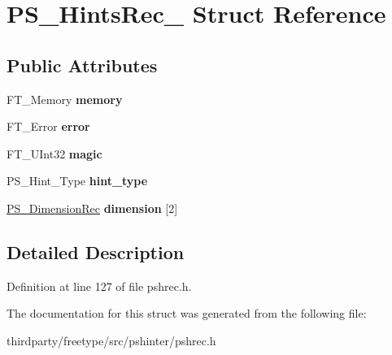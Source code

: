 \hypertarget{struct_p_s___hints_rec__}{}\section{P\+S\+\_\+\+Hints\+Rec\+\_\+ Struct Reference}
\label{struct_p_s___hints_rec__}
\subsection*{Public Attributes}
\begin{DoxyCompactItemize}
\item 
\mbox{\label{struct_p_s___hints_rec___a1955d8cbb903d8d54cc0acb659176534}} 
F\+T\+\_\+\+Memory {\bfseries memory}
\item 
\mbox{\label{struct_p_s___hints_rec___a61dfe6c6fcc2a970c75160109f357f13}} 
F\+T\+\_\+\+Error {\bfseries error}
\item 
\mbox{\label{struct_p_s___hints_rec___acb179af7515aeff1ff70b15785514d78}} 
F\+T\+\_\+\+U\+Int32 {\bfseries magic}
\item 
\mbox{\label{struct_p_s___hints_rec___ac67da6223bf159931da0edbd4885a46e}} 
P\+S\+\_\+\+Hint\+\_\+\+Type {\bfseries hint\+\_\+type}
\item 
\mbox{\label{struct_p_s___hints_rec___aee12973ffdaed3ae12c1438084e776ee}} 
\hyperlink{struct_p_s___dimension_rec__}{P\+S\+\_\+\+Dimension\+Rec} {\bfseries dimension} \mbox{[}2\mbox{]}
\end{DoxyCompactItemize}


\subsection{Detailed Description}


Definition at line 127 of file pshrec.\+h.



The documentation for this struct was generated from the following file\+:\begin{DoxyCompactItemize}
\item 
thirdparty/freetype/src/pshinter/pshrec.\+h\end{DoxyCompactItemize}
